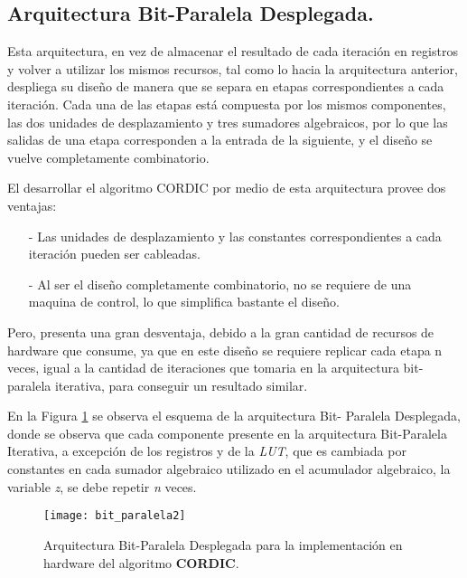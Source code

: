 \subsection{Arquitectura Bit-Paralela Desplegada.}


Esta arquitectura, en vez de almacenar el resultado de cada iteración en registros y volver a utilizar los mismos recursos, tal como lo hacia la arquitectura anterior, despliega su diseño de manera que se separa en etapas correspondientes a cada iteración. Cada una de las etapas está compuesta por los mismos componentes, las dos unidades de desplazamiento y tres sumadores algebraicos, por lo que las salidas de una etapa corresponden a la entrada de la siguiente, y el diseño se vuelve completamente combinatorio.

El desarrollar el algoritmo CORDIC por medio de esta arquitectura provee dos ventajas: 
\begin{itemize}
\item[-]	Las unidades de desplazamiento y las constantes correspondientes a cada iteración pueden ser cableadas.
\item[-]	Al ser el diseño completamente combinatorio, no se requiere de una maquina de control, lo que simplifica bastante el diseño.
\end{itemize}

Pero, presenta una gran desventaja, debido a la gran cantidad de recursos de hardware que consume, ya que en este diseño se requiere replicar cada etapa n veces, igual a la cantidad de iteraciones que tomaria en la arquitectura bit-paralela iterativa, para conseguir un resultado similar.

En la Figura \ref{fig:bit_paralela2} se observa el esquema de la arquitectura Bit- Paralela Desplegada, donde se observa que cada componente presente en la arquitectura Bit-Paralela Iterativa, a excepción de los registros y de la \textit{LUT}, que es cambiada por constantes en cada sumador algebraico utilizado en el acumulador algebraico, la variable \textit{z}, se debe repetir \textit{n} veces.


\begin{figure}[htb]
  \centering
  \texttt{[image: bit\_paralela2]}
  \caption{Arquitectura Bit-Paralela Desplegada para la implementación en hardware del algoritmo \textbf{CORDIC}.}
  \label{fig:bit_paralela2}
\end{figure}

















